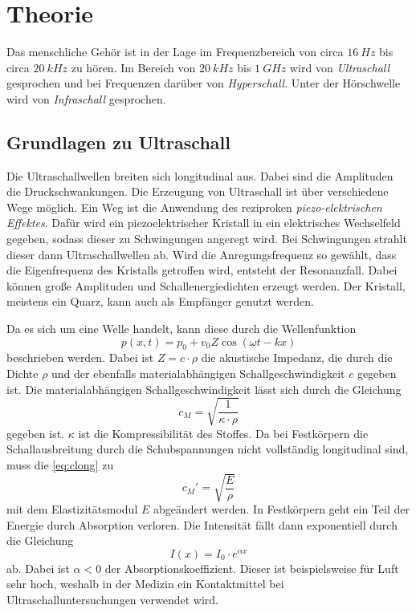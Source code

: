 \section{Theorie}
\label{sec:Theorie}

Das menschliche Gehör ist in der Lage im Frequenzbereich von circa $\qty{16}{Hz}$ bis circa $\qty{20}{kHz}$ zu hören.
Im Bereich von $\qty{20}{kHz}$ bis $\qty{1}{GHz}$ wird von \textit{Ultraschall} gesprochen und bei Frequenzen darüber von \textit{Hyperschall}.
Unter der Hörschwelle wird von \textit{Infraschall} gesprochen.


\subsection{Grundlagen zu Ultraschall}

Die Ultraschallwellen breiten sich longitudinal aus.
Dabei sind die Amplituden die Druckschwankungen. 
Die Erzeugung von Ultraschall ist über verschiedene Wege möglich.
Ein Weg ist die Anwendung des reziproken \textit{piezo-elektrischen Effektes}.
Dafür wird ein piezoelektrischer Kristall in ein elektrisches Wechselfeld gegeben, sodass dieser zu Schwingungen angeregt wird.
Bei Schwingungen strahlt dieser dann Ultraschallwellen ab.
Wird die Anregungsfrequenz so gewählt, dass die Eigenfrequenz des Kristalls getroffen wird, entsteht der Resonanzfall.
Dabei können große Amplituden und Schallenergiedichten erzeugt werden.
Der Kristall, meistens ein Quarz, kann auch als Empfänger genutzt werden.

Da es sich um eine Welle handelt, kann diese durch die Wellenfunktion
\begin{equation}
    p(x, t) = p_0 + v_0 Z \cos (\omega t - k x)
\end{equation}
beschrieben werden. Dabei ist $Z = c \cdot \rho$ die akustische Impedanz, die durch die Dichte $\rho$
und der ebenfalls materialabhängigen Schallgeschwindigkeit $c$ gegeben ist.
Die materialabhängigen Schallgeschwindigkeit lässt sich durch die Gleichung
\begin{equation} \label{eq:clong}
    c_M = \sqrt{\frac{1}{\kappa \cdot \rho}}
\end{equation}
gegeben ist. $\kappa$ ist die Kompressibilität des Stoffes.
Da bei Festkörpern die Schallausbreitung durch die Schubspannungen nicht vollständig longitudinal sind, muss die \autoref{eq:clong} zu
\begin{equation}
    c_M ' = \sqrt{\frac{E}{\rho}}
\end{equation}
mit dem Elastizitätsmodul $E$ abgeändert werden.
In Festkörpern geht ein Teil der Energie durch Absorption verloren.
Die Intensität fällt dann exponentiell durch die Gleichung
\begin{equation} \label{eq:Intensität}
    I(x) = I_0 \cdot e^{\alpha x}
\end{equation}
ab. Dabei ist $\alpha < 0$ der Absorptionskoeffizient.
Dieser ist beispielsweise für Luft sehr hoch, weshalb in der Medizin ein Kontaktmittel bei Ultraschalluntersuchungen verwendet wird. \\

